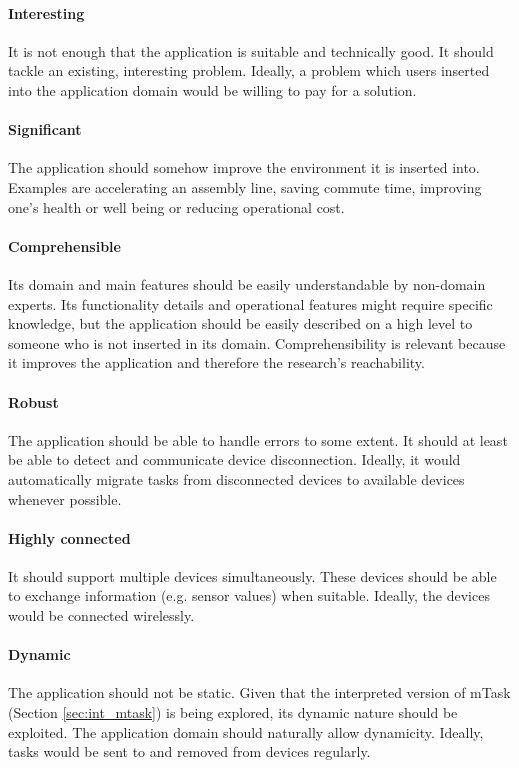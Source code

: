 \paragraph{Interesting} It is not enough that the application is suitable and technically good. It should tackle an existing, interesting problem. Ideally, a problem which users inserted into the application domain would be willing to pay for a solution.

\paragraph{Significant} The application should somehow improve the environment it is inserted into. Examples are accelerating an assembly line, saving commute  time, improving one's health or well being or reducing operational cost.

\paragraph{Comprehensible} Its domain and main features should be easily understandable by non-domain experts. Its functionality details and operational features might require specific knowledge, but the application should be easily described on a high level to someone who is not inserted in its domain. Comprehensibility is relevant because it improves the application and therefore the research's reachability. 

\paragraph{Robust} The application should be able to handle errors to some extent. It should at least be able to detect and communicate device disconnection. Ideally, it would automatically migrate tasks from disconnected devices to available devices whenever possible. 

\paragraph{Highly connected} It should support multiple devices simultaneously. These devices should be able to exchange information (e.g. sensor values) when suitable. Ideally, the devices would be connected wirelessly.

\paragraph{Dynamic} The application should not be static. Given that the interpreted version of \gls{mTask} (Section \ref{sec:int_mtask}) is being explored, its dynamic nature should be exploited. The application domain should naturally allow dynamicity. Ideally, tasks would be sent to and removed from devices regularly.

